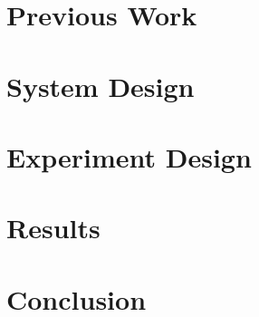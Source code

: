 \documentclass[runningheads]{llncs}
\begin{document}
\section{Previous Work}

\section{System Design}

\section{Experiment Design}

\section{Results}

\section{Conclusion}



\end{document}
